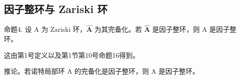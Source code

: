 \subsection{因子整环与 Zariski 环}

命题4. 设 A 为 Zariski 环，\(\hat{\mathbf{A}}\) 为其完备化。若 \(\hat{\mathbf{A}}\) 是因子整环，则 A 是因子整环。

这由第1号定义以及第1节第10号命题16得到。

推论。若诺特局部环 A 的完备化是因子整环，则 A 是因子整环。
\relax{}
